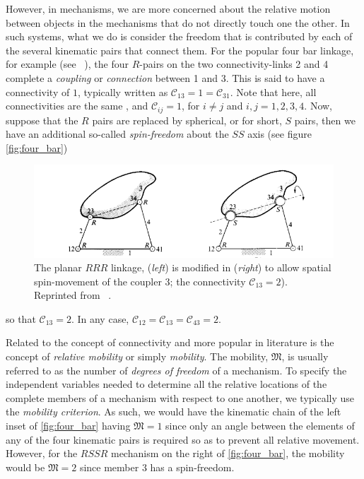 However, in mechanisms, we are more concerned about the relative motion between objects in the mechanisms that do not directly touch one the other. In such systems, what we do is consider the freedom that is contributed by each of the several kinematic pairs that connect them. For the popular four bar linkage, for example (see ~\cite{MurrayBook}), the four $R$-pairs on the two connectivity-links 2 and 4 complete a \textit{coupling} or \textit{connection} between 1 and 3. This is said to have a connectivity of $1$, typically written as $\mathscr{C}_{13}=1= \mathscr{C}_{31}$. Note that here, all connectivities are the same , and $\mathscr{C}_{ij} = 1$, for $i \neq j$ and $i,j=1,2,3,4$. Now, suppose that the $R$ pairs are replaced by spherical, or for short, $S$ pairs, then we have an additional so-called \textit{spin-freedom} about the $SS$ axis (see figure \autoref{fig:four_bar})
%
\begin{figure}[tb!]
	\centering
	\includegraphics[width=\columnwidth]{figures/four-bar-linkage.png}
	\caption{The planar $RRR$ linkage, (\textit{left}) is modified in (\textit{right}) to allow spatial spin-movement of the coupler 3; the connectivity $\mathscr{C}_{13}=2$). Reprinted from ~\cite{HuntBook1977}.}
	\label{fig:four_bar}
\end{figure}
%
so that $\mathscr{C}_{13}=2$. In any case, $\mathscr{C}_{12}=\mathscr{C}_{13}=\mathscr{C}_{43} = 2$.

Related to the concept of connectivity and more popular in literature is the concept of \textit{relative mobility} or simply \textit{mobility}.  The mobility, $\mathfrak{M}$, is usually referred to as the number of \textit{degrees of freedom} of a mechanism. To specify the independent variables needed to determine all the relative locations of the complete members of a mechanism with respect to one another, we typically use the \textit{mobility criterion}. As such, we would have the kinematic chain of the left inset of \autoref{fig:four_bar} having $\mathfrak{M}=1$ since only an angle between the elements of any of the four kinematic pairs is required so as to prevent all relative movement. However, for the $RSSR$ mechanism on the right of \autoref{fig:four_bar}, the mobility would be $\mathfrak{M}=2$ since member $3$ has a spin-freedom.

